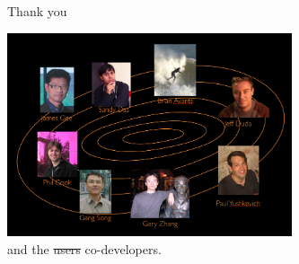 \documentclass[xcolor=dvipsnames,serif,10pt]{beamer}
\begin{document}
\begin{frame}{Thank you}
  \begin{center}
  \includegraphics[height=6cm]{PICSL.png} \\
  and the \sout{users} co-developers.
  \end{center}
\end{frame}


%
%
%
%
%
\end{document}

